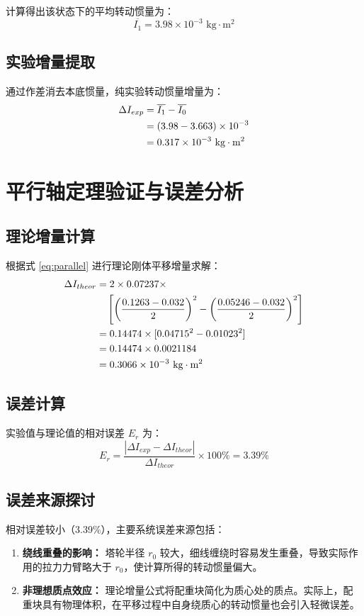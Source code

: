\documentclass[11pt, a4paper, twocolumn]{article}
\begin{document}
	计算得出该状态下的平均转动惯量为：
	\begin{equation}
		\overline{I_1} = 3.98 \times 10^{-3}\text{ kg}\cdot\text{m}^2
	\end{equation}
	
	\subsection{实验增量提取}
	通过作差消去本底惯量，纯实验转动惯量增量为：
	\begin{align}
		\Delta I_{exp} &= \overline{I_1} - \overline{I_0} \notag \\
		&= (3.98 - 3.663) \times 10^{-3} \notag \\
		&= 0.317 \times 10^{-3}\text{ kg}\cdot\text{m}^2
	\end{align}
	
	\section{平行轴定理验证与误差分析}
	
	\subsection{理论增量计算}
	根据式 \eqref{eq:parallel} 进行理论刚体平移增量求解：
	\begin{align}
		\Delta I_{theor} &= 2 \times 0.07237 \times \notag \\
		&\quad \left[ \left(\frac{0.1263 - 0.032}{2}\right)^2 - \left(\frac{0.05246 - 0.032}{2}\right)^2 \right] \notag \\
		&= 0.14474 \times [0.04715^2 - 0.01023^2] \notag \\
		&= 0.14474 \times 0.0021184 \notag \\
		&= 0.3066 \times 10^{-3}\text{ kg}\cdot\text{m}^2
	\end{align}
	
	\subsection{误差计算}
	实验值与理论值的相对误差 $E_r$ 为：
	\begin{equation}
		E_r = \frac{|\Delta I_{exp} - \Delta I_{theor}|}{\Delta I_{theor}} \times 100\% = 3.39\%
	\end{equation}
	
	\subsection{误差来源探讨}
	相对误差较小（3.39\%），主要系统误差来源包括：
	\begin{enumerate}
		\item \textbf{绕线重叠的影响：} 塔轮半径 $r_0$ 较大，细线缠绕时容易发生重叠，导致实际作用的拉力力臂略大于 $r_0$，使计算所得的转动惯量偏大。
		\item \textbf{非理想质点效应：} 理论增量公式将配重块简化为质心处的质点。实际上，配重块具有物理体积，在平移过程中自身绕质心的转动惯量也会引入轻微误差。
	\end{enumerate}
	
\end{document}
